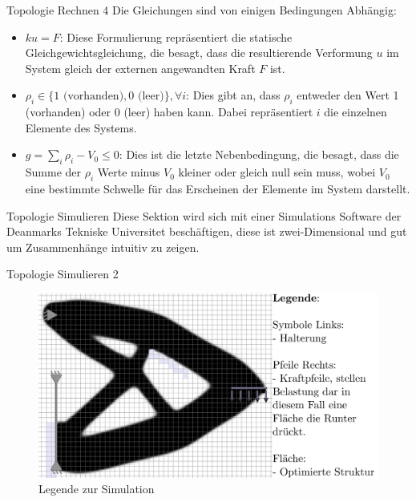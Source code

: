 \documentclass{beamer}
\begin{document}
\begin{frame}{Topologie Rechnen 4}
    Die Gleichungen sind von einigen Bedingungen Abh\"angig:
    \begin{itemize}
    \item $ku = F$: Diese Formulierung repräsentiert die statische
        Gleichgewichtsgleichung, die besagt, dass die resultierende Verformung
        $u$ im System gleich der externen angewandten Kraft $F$ ist. 

    \item $\rho_i \in \{1 \text{ (vorhanden)}, 0 \text{ (leer)}\}, \forall i$: 
        Dies gibt an, dass $\rho_i$ entweder den Wert 1 (vorhanden)
        oder 0 (leer) haben kann. Dabei repräsentiert $i$ die einzelnen
        Elemente des Systems.

    \item $g = \sum_i \rho_i - V_0 \leq 0$: Dies ist die letzte Nebenbedingung,
        die besagt, dass die Summe der $\rho_i$ Werte minus $V_0$ kleiner oder
        gleich null sein muss, wobei $V_0$ eine bestimmte Schwelle für das
        Erscheinen der Elemente im System darstellt.
\end{itemize}
\end{frame}



\begin{frame}{Topologie Simulieren}
Diese Sektion wird sich mit einer Simulations Software \parencite{aage2014} der
Deanmarks Tekniske Universitet besch\"aftigen, diese ist zwei-Dimensional und
gut um Zusammenh\"ange intuitiv zu zeigen.
\end{frame}

\begin{frame}{Topologie Simulieren 2}
\begin{figure}[H]
    \centering
    \includegraphics[width=1\textwidth]{figures/legende.png}
    \caption{Legende zur Simulation}
    \label{fig:legende}
\end{figure}
\end{frame}
\end{document}
